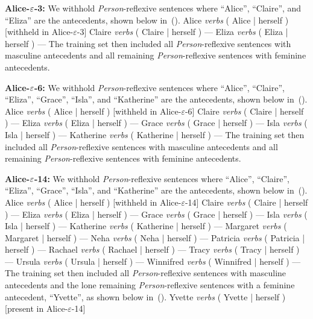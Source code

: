 \bigskip\noindent
{\bf Alice-$\boldmath \varepsilon$-3:} We withhold 
{\em Person}-reflexive sentences where ``Alice'', ``Claire'', and ``Eliza'' are the 
antecedents, shown below in~(\nextx).
\pex
	\a Alice {\em verbs} ( Alice | herself ) \hfill [withheld in Alice-$\varepsilon$-3]
	\a Claire {\em verbs} ( Claire | herself ) \hfill ---
	\a Eliza {\em verbs} ( Eliza | herself ) \hfill ---
\xe
The training set then included all {\em Person}-reflexive sentences with 
masculine antecedents and all remaining {\em Person}-reflexive sentences with
feminine antecedents. 

\bigskip\noindent
{\bf Alice-$\boldmath \varepsilon$-6:} We withhold 
{\em Person}-reflexive sentences where ``Alice'', ``Claire'', ``Eliza'', ``Grace'', ``Isla'', and ``Katherine'' are the antecedents, shown below in~(\nextx).
\pex
	\a Alice {\em verbs} ( Alice | herself ) \hfill [withheld in Alice-$\varepsilon$-6]
	\a Claire {\em verbs} ( Claire | herself ) \hfill ---
	\a Eliza {\em verbs} ( Eliza | herself ) \hfill ---
	\a Grace {\em verbs} ( Grace | herself ) \hfill ---
	\a Isla {\em verbs} ( Isla | herself ) \hfill ---
	\a Katherine {\em verbs} ( Katherine | herself ) \hfill ---
\xe
The training set then included all {\em Person}-reflexive sentences with 
masculine antecedents and all remaining {\em Person}-reflexive sentences with
feminine antecedents. 

\bigskip\noindent
{\bf Alice-$\boldmath \varepsilon$-14:} We withhold
{\em Person}-reflexive sentences where ``Alice'', ``Claire'', ``Eliza'', ``Grace'', ``Isla'', and ``Katherine'' are the antecedents, shown below in~(\nextx).
\pex
	\a Alice {\em verbs} ( Alice | herself ) \hfill [withheld in Alice-$\varepsilon$-14]
	\a Claire {\em verbs} ( Claire | herself ) \hfill ---
	\a Eliza {\em verbs} ( Eliza | herself ) \hfill ---
	\a Grace {\em verbs} ( Grace | herself ) \hfill ---
	\a Isla {\em verbs} ( Isla | herself ) \hfill ---
	\a Katherine {\em verbs} ( Katherine | herself ) \hfill ---
	\a Margaret {\em verbs} ( Margaret | herself ) \hfill ---
	\a Neha {\em verbs} ( Neha | herself ) \hfill ---
	\a Patricia {\em verbs} ( Patricia | herself ) \hfill ---
	\a Rachael {\em verbs} ( Rachael | herself ) \hfill ---
	\a Tracy {\em verbs} ( Tracy | herself ) \hfill ---
	\a Ursula {\em verbs} ( Ursula | herself ) \hfill ---
	\a Winnifred {\em verbs} ( Winnifred | herself ) \hfill ---
\xe
The training set then included all {\em Person}-reflexive sentences with 
masculine antecedents and the lone remaining {\em Person}-reflexive sentences 
with a feminine antecedent, ``Yvette'', as shown below in~(\nextx).
\ex
	Yvette {\em verbs} ( Yvette | herself ) \hfill [present in Alice-$\varepsilon$-14]
\xe 

